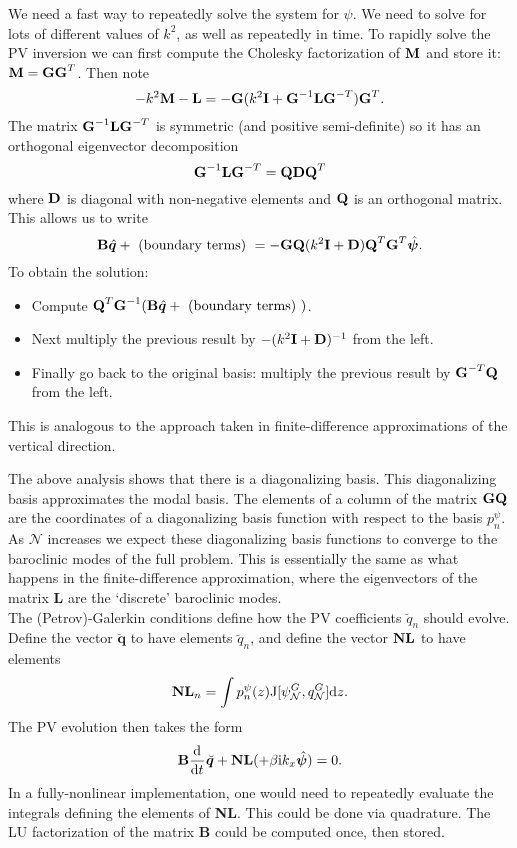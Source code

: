 \documentclass[10pt]{article}
\newcommand{\dd}[3]{\frac{\text{d}^{#3}#1}{\text{d}#2^{#3}}}
\newcommand{\tJ}{\text{J}}
\newcommand{\sN}{\mathcal{N}}
\newcommand{\mat}[1]{\text{\bf #1}}
\begin{document}
We need a fast way to repeatedly solve the system for $\psi$.
We need to solve for lots of different values of $k^2$, as well as repeatedly in time.
To rapidly solve the PV inversion we can first compute the Cholesky factorization of $\mat{M}$ and store it: $\mat{M} = \mat{GG}^T$.
Then note
\[-k^2\mat{M} -\mat{L} = -\mat{G}(k^2\mat{I}+\mat{G}^{-1}\mat{LG}^{-T})\mat{G}^T.\]
The matrix $\mat{G}^{-1}\mat{LG}^{-T}$ is symmetric (and positive semi-definite) so it has an orthogonal eigenvector decomposition
\[\mat{G}^{-1}\mat{LG}^{-T} = \mat{QD}\mat{Q}^{T}\]
where $\mat{D}$ is diagonal with non-negative elements and $\mat{Q}$ is an orthogonal matrix.
This allows us to write
\[\mat{B}\hat{\bm{q}} + \text{ (boundary terms) } = -\mat{GQ}(k^2\mat{I}+\mat{D})\mat{Q}^{T}\mat{G}^{T}\hat{\bm{\psi}}.\]
To obtain the solution:
\begin{itemize}
\item Compute $\mat{Q}^T\mat{G}^{-1}(\mat{B}\hat{\bm{q}} + \text{ (boundary terms) })$.
\item Next multiply the previous result by $-(k^2\mat{I}+\mat{D})^{-1}$ from the left. 
\item Finally go back to the original basis: multiply the previous result by $\mat{G}^{-T}\mat{Q}$ from the left. 
\end{itemize}
This is analogous to the approach taken in finite-difference approximations of the vertical direction.

The above analysis shows that there is a diagonalizing basis.
This diagonalizing basis approximates the modal basis.
The elements of a column of the matrix $\mat{GQ}$ are the coordinates of a diagonalizing basis function with respect to the basis $p_n^\psi$.
As $\sN$ increases we expect these diagonalizing basis functions to converge to the baroclinic modes of the full problem.
This is essentially the same as what happens in the finite-difference approximation, where the eigenvectors of the matrix {\bf L} are the `discrete' baroclinic modes.\\

The (Petrov)-Galerkin conditions  define how the PV coefficients $\breve{q}_n$ should evolve.
Define the vector $\breve{\bm{q}}$ to have elements $\breve{q}_n$, and define the vector $\mat{NL}$ to have elements 
\[\mat{NL}_n = \int p_n^\psi(z)\tJ[\psi_\sN^G,q_\sN^G]\text{d}z.\]
The PV evolution then takes the form
\[\mat{B}\dd{}{t}{}\breve{\bm{q}} + \mat{NL} (+\beta \text{i} k_x\hat{\bm{\psi}}) = 0.\]
In a fully-nonlinear implementation, one would need to repeatedly evaluate the integrals defining the elements of {\bf NL}.
This could be done via quadrature.
The LU factorization of the matrix {\bf B} could be computed once, then stored.\\
\end{document}
